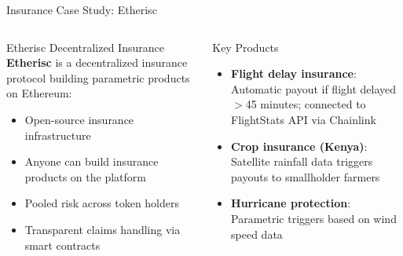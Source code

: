 \documentclass[8pt,aspectratio=169]{beamer}
\begin{document}
\begin{frame}{Insurance Case Study: Etherisc}
\begin{columns}[T]
\begin{block}{Etherisc Decentralized Insurance}
\footnotesize
\textbf{Etherisc} is a decentralized insurance protocol building parametric products on Ethereum:
\begin{itemize}
  \item Open-source insurance infrastructure
  \item Anyone can build insurance products on the platform
  \item Pooled risk across token holders
  \item Transparent claims handling via smart contracts
\end{itemize}
\end{block}
\vspace{2mm}
\begin{exampleblock}{Key Products}
\footnotesize
\begin{itemize}
  \item \textbf{Flight delay insurance}: Automatic payout if flight delayed $>$45 minutes; connected to FlightStats API via Chainlink
  \item \textbf{Crop insurance (Kenya)}: Satellite rainfall data triggers payouts to smallholder farmers
  \item \textbf{Hurricane protection}: Parametric triggers based on wind speed data
\end{itemize}
\end{exampleblock}


\end{columns}
\end{frame}
\end{document}
